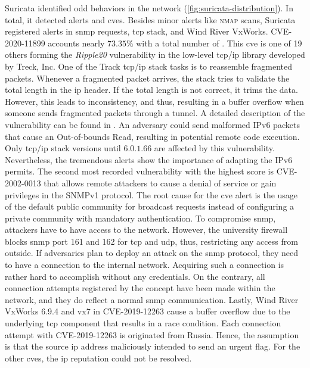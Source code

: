 Suricata identified odd behaviors in the network (\autoref{fig:suricata-distribution}).
In total, it detected  alerts and \acsp{cve}.
Besides minor alerts like \textsc{nmap} scans, Suricata registered alerts in \ac{snmp} requests, \ac{tcp} stack, and Wind River VxWorks.
CVE-2020-11899 \cite{CVE-2020-11899} accounts nearly $73.35\%$ with a total number of .
This \acs{cve} is one of 19 others forming the \textit{Ripple20} vulnerability in the low-level \ac{tcp}/\ac{ip} library developed by Treck, Inc.
One of the Track \ac{tcp}/\ac{ip} stack tasks is to reassemble fragmented packets.
Whenever a fragmented packet arrives, the stack tries to validate the total length in the \ac{ip} header.
If the total length is not correct, it trims the data.
However, this leads to inconsistency, and thus, resulting in a buffer overflow when someone sends fragmented packets through a tunnel.
A detailed description of the vulnerability can be found in \cite{ripple20}.
An adversary could send malformed IPv6 packets that cause an Out-of-bounds Read, resulting in potential remote code execution.
Only \ac{tcp}/\ac{ip} stack versions until $6.0.1.66$ are affected by this vulnerability.
Nevertheless, the tremendous alerts show the importance of adapting the IPv6 permits.
The second most recorded vulnerability with the highest score is CVE-2002-0013 \cite{CVE-2002-0013} that allows remote attackers to cause a denial of service or gain privileges in the SNMPv1 protocol.
The root cause for the \acs{cve} alert is the usage of the default public community for broadcast requests instead of configuring a private community with mandatory authentication.
To compromise \ac{snmp}, attackers have to have access to the network.
However, the university firewall blocks \ac{snmp} port 161 and 162 for \ac{tcp} and \ac{udp}, thus, restricting any access from outside.
If adversaries plan to deploy an attack on the \ac{snmp} protocol, they need to have a connection to the internal network.
Acquiring such a connection is rather hard to accomplish without any credentials.
On the contrary, all connection attempts registered by the concept have been made within the network, and they do reflect a normal \ac{snmp} communication.
Lastly, Wind River VxWorks 6.9.4 and vx7 in CVE-2019-12263 \cite{CVE-2019-12263} cause a buffer overflow due to the underlying \ac{tcp} component that results in a race condition.
Each connection attempt with CVE-2019-12263 is originated from Russia.
Hence, the assumption is that the source \ac{ip} address maliciously intended to send an urgent flag.
For the other \acsp{cve}, the \ac{ip} reputation could not be resolved.

